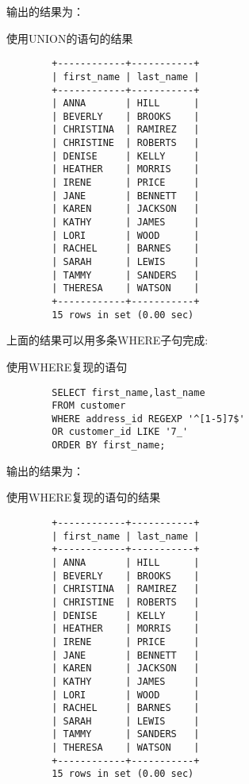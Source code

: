 \documentclass[UTF8]{article}
\begin{document}
输出的结果为：

\begin{listing}[H]
	\caption{使用UNION的语句的结果}
	\label{code:useunionclauseresult}
\begin{verbatim}
        +------------+-----------+
        | first_name | last_name |
        +------------+-----------+
        | ANNA       | HILL      |
        | BEVERLY    | BROOKS    |
        | CHRISTINA  | RAMIREZ   |
        | CHRISTINE  | ROBERTS   |
        | DENISE     | KELLY     |
        | HEATHER    | MORRIS    |
        | IRENE      | PRICE     |
        | JANE       | BENNETT   |
        | KAREN      | JACKSON   |
        | KATHY      | JAMES     |
        | LORI       | WOOD      |
        | RACHEL     | BARNES    |
        | SARAH      | LEWIS     |
        | TAMMY      | SANDERS   |
        | THERESA    | WATSON    |
        +------------+-----------+
        15 rows in set (0.00 sec)
\end{verbatim}
\end{listing}

上面的结果可以用多条WHERE子句完成:
\begin{listing}[H]
        \caption{使用WHERE复现的语句}
	\label{code:usewhererefindclause}
\begin{verbatim}
        SELECT first_name,last_name 
        FROM customer 
        WHERE address_id REGEXP '^[1-5]7$' 
        OR customer_id LIKE '7_' 
        ORDER BY first_name;
\end{verbatim}
\end{listing}

输出的结果为：

\begin{listing}[H]
	\caption{使用WHERE复现的语句的结果}
	\label{code:usewhererefindclauseresult}
\begin{verbatim}
        +------------+-----------+
        | first_name | last_name |
        +------------+-----------+
        | ANNA       | HILL      |
        | BEVERLY    | BROOKS    |
        | CHRISTINA  | RAMIREZ   |
        | CHRISTINE  | ROBERTS   |
        | DENISE     | KELLY     |
        | HEATHER    | MORRIS    |
        | IRENE      | PRICE     |
        | JANE       | BENNETT   |
        | KAREN      | JACKSON   |
        | KATHY      | JAMES     |
        | LORI       | WOOD      |
        | RACHEL     | BARNES    |
        | SARAH      | LEWIS     |
        | TAMMY      | SANDERS   |
        | THERESA    | WATSON    |
        +------------+-----------+
        15 rows in set (0.00 sec)
\end{verbatim}
\end{listing}
\end{document}
